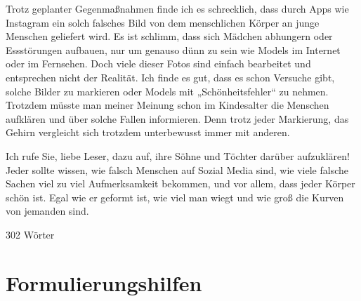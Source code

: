 Trotz geplanter Gegenmaßnahmen finde ich es schrecklich, dass durch Apps wie Instagram ein solch falsches Bild von dem menschlichen Körper an junge Menschen geliefert wird. Es ist schlimm, dass sich Mädchen abhungern oder Essstörungen aufbauen, nur um genauso dünn zu sein wie Models im Internet oder im Fernsehen. Doch viele dieser Fotos sind einfach bearbeitet und entsprechen nicht der Realität. Ich finde es gut, dass es schon Versuche gibt, solche Bilder zu markieren oder Models mit „Schönheitsfehler“ zu nehmen. Trotzdem müsste man meiner Meinung schon im Kindesalter die Menschen aufklären und über solche Fallen informieren. Denn trotz jeder Markierung, das Gehirn vergleicht sich trotzdem unterbewusst immer mit anderen. 

Ich rufe Sie, liebe Leser, dazu auf, ihre Söhne und Töchter darüber aufzuklären! Jeder sollte wissen, wie falsch Menschen auf Sozial Media sind, wie viele falsche Sachen viel zu viel Aufmerksamkeit bekommen, und vor allem, dass jeder Körper schön ist. Egal wie er geformt ist, wie viel man wiegt und wie groß die Kurven von jemanden sind. 

302 Wörter 

\newpage


\section{Formulierungshilfen}

